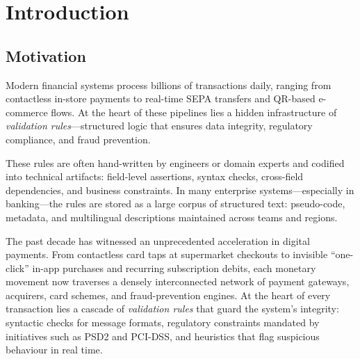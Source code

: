\chapter{Introduction}
\label{ch:introduction}

\section{Motivation}
\label{sec:motivation}
Modern financial systems process billions of transactions daily, ranging from contactless in-store payments to real-time SEPA transfers and QR-based e-commerce flows. 
At the heart of these pipelines lies a hidden infrastructure of \emph{validation rules}—structured logic that ensures data integrity, regulatory compliance, and fraud prevention.

These rules are often hand-written by engineers or domain experts and codified into technical artifacts: field-level assertions, syntax checks, cross-field dependencies, and business constraints. 
In many enterprise systems—especially in banking—the rules are stored as a large corpus of structured text: pseudo-code, metadata, and multilingual descriptions maintained across teams and regions.

The past decade has witnessed an unprecedented acceleration in digital payments.  
From contactless card taps at supermarket checkouts to invisible “one-click” in-app purchases and recurring subscription debits, each monetary movement now traverses a densely interconnected network of payment gateways, acquirers, card schemes, and fraud-prevention engines.  
At the heart of every transaction lies a cascade of \emph{validation rules} that guard the system’s integrity: syntactic checks for message formats, regulatory constraints mandated by initiatives such as PSD2 and PCI-DSS, and heuristics that flag suspicious behaviour in real time.

